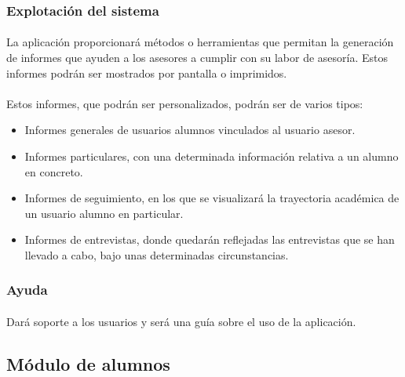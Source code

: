       \subsubsection{Explotación del sistema}

      \paragraph{}La aplicación proporcionará métodos o herramientas que
      permitan la generación de informes que ayuden a los asesores a cumplir con
      su labor de asesoría. Estos informes podrán ser mostrados por pantalla o
      imprimidos.

      \paragraph{}Estos informes, que podrán ser personalizados, podrán ser
      de varios tipos:

      \begin{itemize}
       \item Informes generales de usuarios alumnos vinculados al usuario
             asesor.
       \item Informes particulares, con una determinada información relativa a
             un alumno en concreto.
       \item Informes de seguimiento, en los que se visualizará la trayectoria
             académica de un usuario alumno en particular.
       \item Informes de entrevistas, donde quedarán reflejadas las entrevistas
             que se han llevado a cabo, bajo unas determinadas circunstancias.
      \end{itemize}

      \subsubsection{Ayuda}

      \paragraph{}Dará soporte a los usuarios y será una guía sobre el uso de
      la aplicación.

   \subsection{Módulo de alumnos}\label{modAlumnos}


